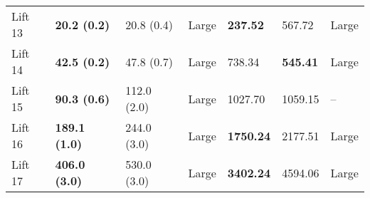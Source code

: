 \begin{tabular}{lllllll}
 Lift 13 &   \textbf{20.2 (0.2)} &             20.8 (0.4) &       Large &         \textbf{237.52} &                   567.72 &       Large \\
 Lift 14 &   \textbf{42.5 (0.2)} &             47.8 (0.7) &       Large &                  738.34 &          \textbf{545.41} &       Large \\
 Lift 15 &   \textbf{90.3 (0.6)} &            112.0 (2.0) &       Large &                 1027.70 &                  1059.15 &          -- \\
 Lift 16 &  \textbf{189.1 (1.0)} &            244.0 (3.0) &       Large &        \textbf{1750.24} &                  2177.51 &       Large \\
 Lift 17 &  \textbf{406.0 (3.0)} &            530.0 (3.0) &       Large &        \textbf{3402.24} &                  4594.06 &       Large \\
\bottomrule
\end{tabular}
